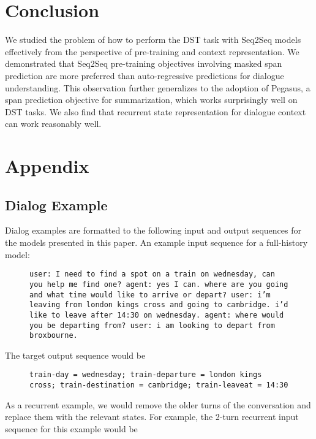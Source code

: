 \documentclass[11pt]{article}
\begin{document}
\section{Conclusion}
We studied the problem of how to perform the DST task with Seq2Seq models effectively from the perspective of pre-training and context representation. We demonstrated that Seq2Seq pre-training objectives involving masked span prediction are more preferred than auto-regressive predictions for dialogue understanding. This observation further generalizes to the adoption of Pegasus, a span prediction objective for summarization, which works surprisingly well on DST tasks. We also find that recurrent state representation for dialogue context can work reasonably well.




\appendix

\section{Appendix}
\label{sec:appendix}

\subsection{Dialog Example}
\label{sec:appendix-dialog-example}
Dialog examples are formatted to the following input and output sequences for the models presented in this paper. An example input sequence for a full-history model:

\begin{figure}[H]
\begin{small}
\texttt{user: I need to find a spot on a train on wednesday, can you help me find one? agent: yes I can. where are you going and what time would like to arrive or depart? user: i'm leaving from london kings cross and going to cambridge. i'd like to leave after 14:30 on wednesday. agent: where would you be departing from? user: i am looking to depart from broxbourne.}
\end{small}
\end{figure}

The target output sequence would be

\begin{figure}[H]
\begin{small}
\texttt{train-day = wednesday; train-departure = london kings cross; train-destination = cambridge; train-leaveat = 14:30}
\end{small}
\end{figure}
As a recurrent example, we would remove the older turns of the conversation and replace them with the relevant states. For example, the 2-turn recurrent input sequence for this example would be
\end{document}
